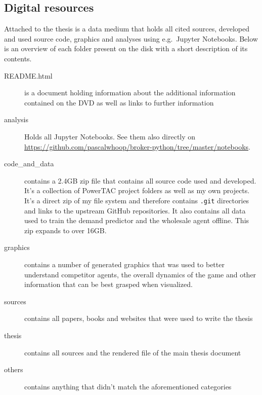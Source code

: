 
\begin{appendices}

    \chapter{Digital resources}
    Attached to the thesis is a data medium that holds all cited sources, developed and used source code, graphics and
    analyses using e.g.\ Jupyter Notebooks. Below is an overview of each folder present on the disk with a short description
    of its contents.

    \begin{description}
        \item[README.html] is a document holding information about the additional information contained on the DVD as well
            as links to further information
        \item[analysis] Holds all Jupyter Notebooks. See them also directly on
            \url{https://github.com/pascalwhoop/broker-python/tree/master/notebooks}.
        \item[code\_and\_data] contains a 2.4GB zip file that contains all source code used and developed. It's a collection of \ac{PowerTAC}
            project folders as well as my own projects. It's a direct zip of my file system and therefore contains \texttt{.git}
            directories and links to the upstream GitHub repositories. It also contains all data used to train the demand predictor
            and the wholesale agent offline. This zip expands to over 16GB.
        \item[graphics] contains a number of generated graphics that was used to better understand competitor agents, the
            overall dynamics of the game and other information that can be best grasped when visualized.
        \item[sources] contains all papers, books and websites that were used to write the thesis
        \item[thesis] contains all sources and the rendered  file of the main thesis document
        \item[others] contains anything that didn't match the aforementioned categories
    \end{description}
\end{appendices}
